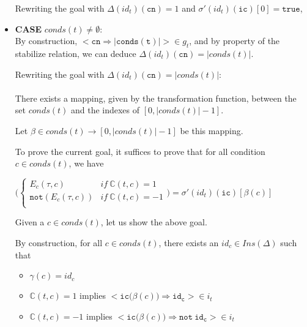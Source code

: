 \documentclass[dvipsnames,12pt]{article}
\begin{document}
\begin{niproof}
\begin{itemize}
    Rewriting the goal with $\Delta(id_t)(\texttt{cn})=1$ and
    $\sigma'(id_t)(\texttt{ic})[0]=\mathtt{true}$, 
    
  \item \textbf{CASE} $conds(t)\neq\emptyset$:\\
    By construction,
    ${<}\mathtt{cn\Rightarrow{}\vert{}conds(t)\vert}{>}\in{}g_t$, and
    by property of the stabilize relation, we can deduce
    $\Delta(id_t)(\texttt{cn})=\vert{}conds(t)\vert$.
    
    Rewriting the goal with $\Delta(id_t)(\texttt{cn})=\vert{}conds(t)\vert$:\\
    \\

    There exists a mapping, given by the transformation function,
    between the set $conds(t)$ and the indexes of
    $[0,\vert{}conds(t){}\vert-1]$.

    Let $\beta\in{}conds(t)\rightarrow[0,\vert{}conds(t){}\vert-1]$ be
    this mapping.

    To prove the current goal, it suffices to prove that for all
    condition $c\in{}conds(t)$, we have

    \begin{frameb}
      $\bigg(\begin{cases}
        E_c(\tau,c) & if~\mathbb{C}(t,c)=1 \\
        \mathtt{not}(E_c(\tau,c)) & if~\mathbb{C}(t,c)=-1 \\
      \end{cases}\bigg)=\sigma'(id_t)(\texttt{ic})[\beta(c)]$
    \end{frameb}

    Given a $c\in{}conds(t)$, let us show the above goal.
    
    By construction, for all $c\in{}conds(t)$, there exists an
    $id_c\in{}Ins(\Delta)$ such that
    \begin{itemize}
    \item $\gamma(c)=id_c$
    \item $\mathbb{C}(t,c)=1$ implies
      ${<}\mathtt{ic(}\beta(c)\mathtt{)\Rightarrow{}id_c}{>}\in{}i_t$
    \item $\mathbb{C}(t,c)=-1$ implies
      ${<}\mathtt{ic(}\beta(c)\mathtt{)\Rightarrow{}not~id_c}{>}\in{}i_t$
    \end{itemize}


\end{itemize}
\end{niproof}
\end{document}
